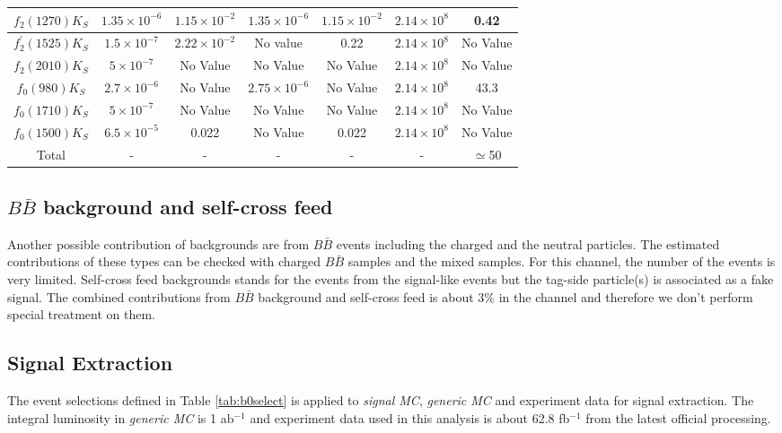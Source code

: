 \begin{table}
\begin{tabular}{|c|c|c|c|c|c|c|}
		\hline
		$f_2(1270)K_S$ & $1.35\times 10^{-6}$ & $1.15\times 10^{-2}$ & $1.35\times 10^{-6}$ & $1.15\times 10^{-2}$ & $2.14\times 10^8$ & 0.42 \\
		\hline
		$f_{2}^{'}(1525)K_S$ & $1.5\times 10^{-7} $ & $2.22\times 10^{-2}$ & No value & 0.22 & $2.14\times 10^8$ & No Value \\
		\hline
		$f_2(2010)K_S$ & $5\times 10^{-7}$ & No Value  & No Value  & No Value  & $2.14\times 10^8$ & No Value \\
		\hline
		$f_0(980)K_S$ & $2.7\times 10^{-6}$ & No Value & $2.75\times 10^{-6}$ & No Value & $2.14\times 10^8$ & 43.3 \\
		\hline
		$f_0(1710)K_S$ & $5\times 10^{-7}$ & No Value  & No Value  & No Value  & $2.14\times 10^8$ & No Value \\
		\hline
		$f_0(1500)K_S$ & $6.5\times 10^{-5}$ & 0.022 & No Value & 0.022 & $2.14\times 10^8$ & No Value \\
		\hline
		Total  & - & - & - & - & - & $\simeq$50 \\
		\hline
	\end{tabular}
\end{table}


\subsection{$B\bar{B}$ background and self-cross feed}
Another possible contribution of backgrounds are from $B\bar{B}$ events including the charged and the neutral particles. The estimated contributions of these types can be checked with charged $B\bar{B}$ samples and the mixed samples. For this channel, the number of the events is very limited. Self-cross feed backgrounds stands for the events from the signal-like events but the tag-side particle(s) is associated as a fake signal. The combined contributions from $B\bar{B}$ background and self-cross feed is about 3\% in the channel and therefore we don't perform special treatment on them.

\subsection{Signal Extraction}
The event selections defined in Table \ref{tab:b0select} is applied to \textit{signal MC}, \textit{generic MC} and experiment data for signal extraction. The integral luminosity in \textit{generic MC} is 1 ab$^{-1}$ and experiment data used in this analysis is about 62.8 fb$^{-1}$ from the latest official processing. 

